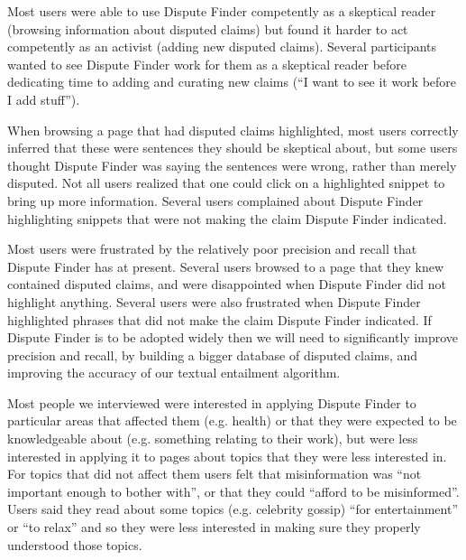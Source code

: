 \documentclass{www2010-submission}
\begin{document}
Most users were able to use Dispute Finder competently as a skeptical reader (browsing information about disputed claims) but found it harder to act competently as an activist (adding new disputed claims). Several participants wanted to see Dispute Finder work for them as a skeptical reader before dedicating time to adding and curating new claims (``I want to see it work before I add stuff'').

When browsing a page that had disputed claims highlighted, most users correctly inferred that these were sentences they should be skeptical about, but some users thought Dispute Finder was saying the sentences were wrong, rather than merely disputed. Not all users realized that one could click on a highlighted snippet to bring up more information. Several users complained about Dispute Finder highlighting snippets that were not making the claim Dispute Finder indicated.

Most users were frustrated by the relatively poor precision and recall that Dispute Finder has at present. Several users browsed to a page that they knew contained disputed claims, and were disappointed when Dispute Finder did not highlight anything. Several users were also frustrated when Dispute Finder highlighted phrases that did not make the claim Dispute Finder indicated. If Dispute Finder is to be adopted widely then we will need to significantly improve precision and recall, by building a bigger database of disputed claims, and improving the accuracy of our textual entailment algorithm.

Most people we interviewed were interested in applying Dispute Finder to particular areas that affected them (e.g. health) or that they were expected to be knowledgeable about (e.g. something relating to their work), but were less interested in applying it to pages about topics that they were less interested in. For topics that did not affect them users felt that misinformation was ``not important enough to bother with'', or that they could ``afford to be misinformed''. Users said they read about some topics (e.g. celebrity gossip) ``for entertainment'' or ``to relax'' and so they were less interested in making sure they properly understood those topics.

%
\end{document}
